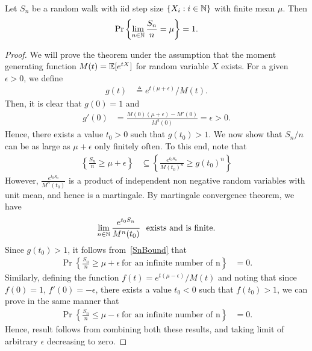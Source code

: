 \documentclass[a4paper,10pt,english]{article}
\begin{document}
\begin{thm} Let $S_n$ be a random walk with iid step size $\{X_i: i \in \mathbb{N}\}$ with finite mean $\mu$. %
Then
\begin{align*}
\Pr\left\{\lim_{n \in \mathbb{N}}\frac{S_n}{n} = \mu\right\} = 1.
\end{align*}
\end{thm}
\begin{proof}
We will prove the theorem under the assumption that the moment generating function $M(t)=\mathbb{E}[e^{tX}]$ for random variable $X$ exists. 
For a given $\epsilon>0$, we define
\begin{align*}
g(t) & \triangleq e^{t(\mu+\epsilon)}/M(t).
\end{align*}
Then, it is clear that $g(0) = 1$ and 
\begin{align*}
g'(0)& =\frac{ M(0)(\mu+\epsilon) -M'(0)  }{M^2(0)}=\epsilon >0.
\end{align*}
Hence, there exists a value $t_0>0$ such that $g(t_0)>1$. We now show that $S_n/n$ can be as large as $\mu+\epsilon$ only finitely often. 
To this end, note that
\begin{align}
\label{SnBound}
\left\{\frac{S_n}{n} \geq \mu+\epsilon \right\} &\subseteq \left\{ \frac{e^{t_0S_n}}{M(t_0)^n} \geq { g(t_0)}^n \right\}
\end{align}
However, $\frac{e^{t_0S_n}}{M^n(t_0)}$ is a product of independent non negative random variables with unit mean, and hence is a martingale. 
By martingale convergence theorem, we have 
\begin{align*}
\lim_{n \in \mathbb{N} } \frac{e^{t_0S_n}}{M^n(t_0)} ~\text{ exists and is finite}.
\end{align*}
Since $g(t_0) >1$, it follows from~\eqref{SnBound} that
\begin{align*}
\Pr\left\{\frac{S_n}{n} \geq \mu+\epsilon ~\text{for an infinite number of n} \right\} &= 0.
\end{align*}
Similarly, defining the function $f(t)=e^{t(\mu-\epsilon)}/M(t)$ and noting that since $f(0)=1$, $f'(0)=-\epsilon$, there exists a value $t_0<0$ such that $f(t_0)>1$, we can prove in the same manner that
\begin{align*}
\Pr\left\{\frac{S_n}{n} \leq \mu-\epsilon ~\text{for an infinite number of n} \right\} &= 0.
\end{align*}
Hence, result follows from combining both these results, and taking limit of arbitrary $\epsilon$ decreasing to zero.
\end{proof}
\end{document}

